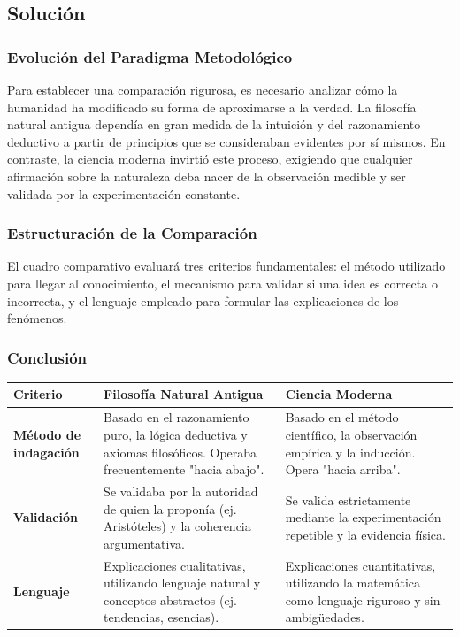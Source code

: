 \documentclass[12pt, a4paper]{article}
\begin{document}
\subsection*{Solución}

\subsubsection*{Evolución del Paradigma Metodológico}
Para establecer una comparación rigurosa, es necesario analizar cómo la humanidad ha modificado su forma de aproximarse a la verdad. La filosofía natural antigua dependía en gran medida de la intuición y del razonamiento deductivo a partir de principios que se consideraban evidentes por sí mismos. En contraste, la ciencia moderna invirtió este proceso, exigiendo que cualquier afirmación sobre la naturaleza deba nacer de la observación medible y ser validada por la experimentación constante.

\subsubsection*{Estructuración de la Comparación}
El cuadro comparativo evaluará tres criterios fundamentales: el método utilizado para llegar al conocimiento, el mecanismo para validar si una idea es correcta o incorrecta, y el lenguaje empleado para formular las explicaciones de los fenómenos.

\subsubsection*{Conclusión}
\begin{center}
\renewcommand{\arraystretch}{1.5}
\begin{tabular}{|p{3cm}|p{5.5cm}|p{5.5cm}|}
\hline
\textbf{Criterio} & \textbf{Filosofía Natural Antigua} & \textbf{Ciencia Moderna} \\
\hline
\textbf{Método de indagación} & Basado en el razonamiento puro, la lógica deductiva y axiomas filosóficos. Operaba frecuentemente "hacia abajo". & Basado en el método científico, la observación empírica y la inducción. Opera "hacia arriba". \\
\hline
\textbf{Validación} & Se validaba por la autoridad de quien la proponía (ej. Aristóteles) y la coherencia argumentativa. & Se valida estrictamente mediante la experimentación repetible y la evidencia física. \\
\hline
\textbf{Lenguaje} & Explicaciones cualitativas, utilizando lenguaje natural y conceptos abstractos (ej. tendencias, esencias). & Explicaciones cuantitativas, utilizando la matemática como lenguaje riguroso y sin ambigüedades. \\
\hline
\end{tabular}
\end{center}
\end{document}
